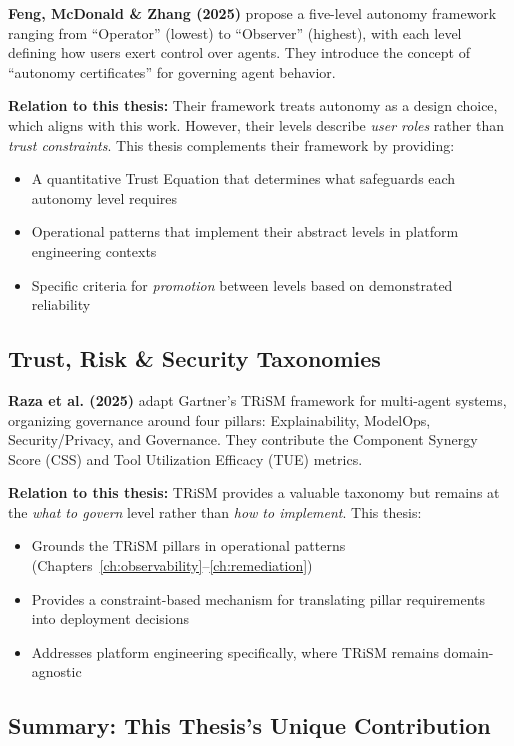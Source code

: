 \textbf{Feng, McDonald \& Zhang (2025)} propose a five-level autonomy framework ranging from ``Operator'' (lowest) to ``Observer'' (highest), with each level defining how users exert control over agents. They introduce the concept of ``autonomy certificates'' for governing agent behavior.

\textbf{Relation to this thesis:} Their framework treats autonomy as a design choice, which aligns with this work. However, their levels describe \textit{user roles} rather than \textit{trust constraints}. This thesis complements their framework by providing:
\begin{itemize}
    \item A quantitative Trust Equation that determines what safeguards each autonomy level requires
    \item Operational patterns that implement their abstract levels in platform engineering contexts
    \item Specific criteria for \textit{promotion} between levels based on demonstrated reliability
\end{itemize}

\subsection{Trust, Risk \& Security Taxonomies}
\label{subsec:trust-taxonomies}

\textbf{Raza et al. (2025)} adapt Gartner's TRiSM framework for multi-agent systems, organizing governance around four pillars: Explainability, ModelOps, Security/Privacy, and Governance. They contribute the Component Synergy Score (CSS) and Tool Utilization Efficacy (TUE) metrics.

\textbf{Relation to this thesis:} TRiSM provides a valuable taxonomy but remains at the \textit{what to govern} level rather than \textit{how to implement}. This thesis:
\begin{itemize}
    \item Grounds the TRiSM pillars in operational patterns (Chapters~\ref{ch:observability}--\ref{ch:remediation})
    \item Provides a constraint-based mechanism for translating pillar requirements into deployment decisions
    \item Addresses platform engineering specifically, where TRiSM remains domain-agnostic
\end{itemize}

\subsection{Summary: This Thesis's Unique Contribution}
\label{subsec:unique-contribution}

